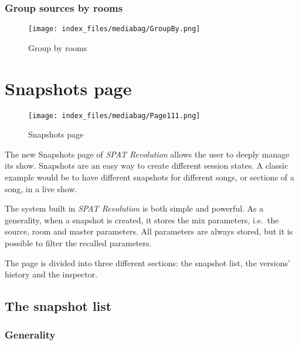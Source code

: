 \documentclass[
  letterpaper,
  DIV=11,
  numbers=noendperiod]{scrreport}
\begin{document}
\hypertarget{group-sources-by-rooms}{%
\subsection{Group sources by rooms}\label{group-sources-by-rooms}}

\begin{figure}

{\centering \texttt{[image: index\_files/mediabag/GroupBy.png]}

}

\caption{Group by rooms}

\end{figure}

\hypertarget{snapshots-page}{%
\chapter{Snapshots page}\label{snapshots-page}}

\begin{figure}

{\centering \texttt{[image: index\_files/mediabag/Page111.png]}

}

\caption{Snapshots page}

\end{figure}

The new Snapshots page of \emph{SPAT Revolution} allows the user to
deeply manage its show. Snapshots are an easy way to create different
session states. A classic example would be to have different snapshots
for different songs, or sections of a song, in a live show.

The system built in \emph{SPAT Revolution} is both simple and powerful.
As a generality, when a snapshot is created, it stores the mix
parameters, i.e.~the source, room and master parameters. All parameters
are always stored, but it is possible to filter the recalled parameters.

The page is divided into three different sections: the snapshot list,
the versions' history and the inspector.

\hypertarget{the-snapshot-list}{%
\section{The snapshot list}\label{the-snapshot-list}}

\hypertarget{generality}{%
\subsection{Generality}\label{generality}}
\end{document}
